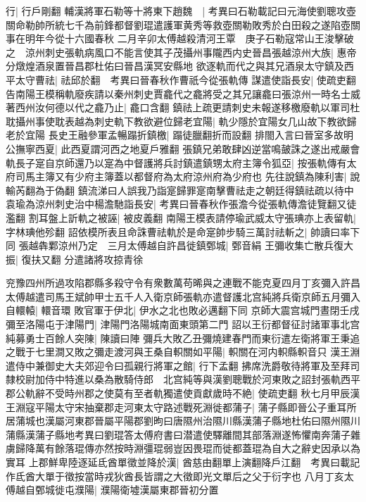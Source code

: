 行|{
	行戶剛翻}
輔漢將軍石勒等十將東下趙魏　|{
	考異曰石勒載記曰元海使劉聰攻壺關命勒帥所統七千為前鋒都督劉琨遣護軍黄秀等救壺關勒敗秀於白田殺之遂陷壺關事在明年今從十六國春秋}
二月辛卯太傅越殺清河王覃　庚子石勒寇常山王浚擊破之　涼州刺史張軌病風口不能言使其子茂攝州事隴西内史晉昌張越涼州大族|{
	惠帝分燉煌酒泉置晉昌郡杜佑曰晉昌漢冥安縣地}
欲逐軌而代之與其兄酒泉太守鎮及西平太守曹祛|{
	祛邱於翻　考異曰晉春秋作曹祇今從張軌傳}
謀遣使詣長安|{
	使疏吏翻}
告南陽王模稱軌廢疾請以秦州刺史賈龕代之龕將受之其兄讓龕曰張涼州一時名士威著西州汝何德以代之龕乃止|{
	龕口含翻}
鎮祛上疏更請刺史未報遂移檄廢軌以軍司杜耽攝州事使耽表越為刺史軌下教欲避位歸老宜陽|{
	軌少隱於宜陽女几山故下教欲歸老於宜陽}
長史王融參軍孟暢蹋折鎮檄|{
	蹋徒臘翻折而設翻}
排閤入言曰晉室多故明公撫寧西夏|{
	此西夏謂河西之地夏戶雅翻}
張鎮兄弟敢肆凶逆當鳴皷誅之遂出戒嚴會軌長子寔自京師還乃以寔為中督護將兵討鎮遣鎮甥太府主簿令狐亞|{
	按張軌傳有太府司馬主簿又有少府主簿蓋以都督府為太府涼州府為少府也}
先往說鎮為陳利害|{
	說輸芮翻為于偽翻}
鎮流涕曰人誤我乃詣寔歸罪寔南擊曹祛走之朝廷得鎮祛疏以待中袁瑜為涼州刺史治中楊澹馳詣長安|{
	考異曰晉春秋作張澹今從張軌傳澹徒覽翻又徒濫翻}
割耳盤上訢軌之被誣|{
	被皮義翻}
南陽王模表請停瑜武威太守張琠亦上表留軌|{
	字林琠他殄翻}
詔依模所表且命誅曹祛軌於是命寔帥步騎三萬討祛斬之|{
	帥讀曰率下同}
張越犇鄴涼州乃定　三月太傅越自許昌徙鎮鄄城|{
	鄄音絹}
王彌收集亡散兵復大振|{
	復扶又翻}
分遣諸將攻掠青徐

兖豫四州所過攻陷郡縣多殺守令有衆數萬苟晞與之連戰不能克夏四月丁亥彌入許昌太傅越遣司馬王斌帥甲士五千人入衛京師張軌亦遣督護北宫純將兵衛京師五月彌入自轘轅|{
	轘音環}
敗官軍于伊北|{
	伊水之北也敗必邁翻下同}
京師大震宫城門晝閉壬戌彌至洛陽屯于津陽門|{
	津陽門洛陽城南面東頭第二門}
詔以王衍都督征討諸軍事北宫純募勇士百餘人突陳|{
	陳讀曰陣}
彌兵大敗乙丑彌燒建春門而東衍遣左衛將軍王秉追之戰于七里澗又敗之彌走渡河與王桑自軹關如平陽|{
	軹關在河内軹縣軹音只}
漢王淵遣侍中兼御史大夫郊迎令曰孤親行將軍之館|{
	行下孟翻}
拂席洗爵敬待將軍及至拜司隸校尉加侍中特進以桑為散騎侍郎　北宫純等與漢劉聰戰於河東敗之詔封張軌西平郡公軌辭不受時州郡之使莫有至者軌獨遣使貢獻歲時不絶|{
	使疏吏翻}
秋七月甲辰漢王淵寇平陽太守宋抽棄郡走河東太守路述戰死淵徙都蒲子|{
	蒲子縣即晉公子重耳所居蒲城也漢屬河東郡晉屬平陽郡劉昫曰唐隰州治隰川縣漢蒲子縣地杜佑曰隰州隰川蒲縣漢蒲子縣地考異曰劉琨答太傅府書曰潜遣使驛離間其部落淵遂怖懼南奔蒲子雜虜歸降萬有餘落琨傳亦然按時淵彊琨弱豈因畏琨而徙都蓋琨為自大之辭史因承以為實耳}
上郡鮮卑陸逐延氐酋單徵並降於漢|{
	酋慈由翻單上演翻降戶江翻　考異曰載記作氐酋大單于徵按當時戎狄酋長皆謂之大徵即光文單后之父于衍字也}
八月丁亥太傅越自鄄城徙屯濮陽|{
	濮陽衛墟漢屬東郡晉初分置}


